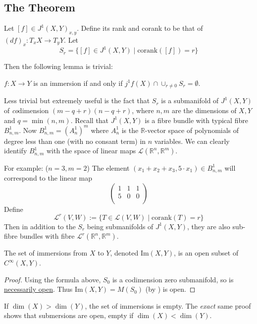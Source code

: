 \documentclass[12pt]{article}
\newcommand{\RR}{\mathbb{R}}
\begin{document}
\subsection{The Theorem}

Let $[f] \in J^1(X, Y)_{x, y}$. Define its rank and corank to be that of $(df)_x: T_x X \to T_y Y$. Let 
$$
S_r = \{ [f] \in J^1(X, Y) \mid \text{corank}([f]) = r\}
$$

Then the following lemma is trivial:

\begin{lemma} \label{trivial lemma}
    $f: X \to Y$ is an immersion if and only if $j^1 f(X) \cap \cup_{r\neq 0} S_r = \emptyset$. 
\end{lemma}

Less trivial but extremely useful is the fact that $S_r$ is a submanifold of $J^1(X, Y)$ of \emph{co}dimension $(m-q+r)(n-q+r)$, where $n, m$ are the dimensions of $X, Y$ and $q = \min(n, m)$. Recall that $J^1(X, Y)$ is a fibre bundle with typical fibre $B_{n, m}^1$. Now $B_{n, m}^1 = \left(A_n^1 \right)^m$ where $A_n^1$ is the $\RR$-vector space of polynomials of degree less than one (with no consant term) in $n$ variables. We can clearly identify $B_{n, m}^1$ with the space of linear maps $\mathcal{L}(\RR^n, \RR^m)$. \par 
For example: ($n=3, m=2$) The element $(x_1+x_2 + x_3, 5\cdot x_1) \in B_{n, m}^1$ will correspond to the linear map 
$$
\begin{pmatrix}
    1 & 1 & 1 \\ 
    5 & 0 & 0 \\
\end{pmatrix}
$$
Define
$$
\mathcal{L}^r(V, W) := \{ T \in \mathcal{L}(V, W) \mid \text{corank}(T) = r\}
$$
Then in addition to the $S_r$ being submanifolds of $J^1(X, Y)$, they are also sub-fibre bundles with fibre $\mathcal{L}^r(\RR^n, \RR^m)$. 


\begin{lemma}
    The set of immersions from $X$ to $Y$, denoted Im$(X, Y)$, is an open subset of $C^\infty(X, Y)$. 
\end{lemma}

\begin{proof}
    Using the formula above, $S_0$ is a codimension zero submanifold, so is \href{https://math.stackexchange.com/questions/1425555/is-every-topological-submanifold-of-codimension-0-open}{necessarily open}. Thus Im$(X, Y) = M(S_0)$ (by ) is open. 
\end{proof}
If $\dim(X) > \dim(Y)$, the set of immersions is empty. The \emph{exact} same proof shows that submersions are open, empty if $\dim(X) < \dim(Y)$.  \par
\end{document}
